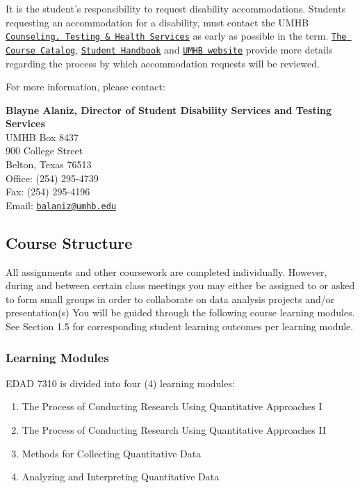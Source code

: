 \documentclass[
]{article}
\providecommand{\tightlist}{%
  \setlength{\itemsep}{0pt}\setlength{\parskip}{0pt}}
\begin{document}
It is the student's responsibility to request disability accommodations.
Students requesting an accommodation for a disability, must contact the
UMHB
\href{http://cths.umhb.edu/disability}{\texttt{Counseling, Testing \& Health Services}}
as early as possible in the term.
\href{http://catalog.umhb.edu/en/2019-2020/Graduate-Catalog}{\texttt{The Course Catalog}},
\href{http://students.umhb.edu/student-handbook}{\texttt{Student Handbook}}
and \href{https://go.umhb.edu/}{\texttt{UMHB website}} provide more
details regarding the process by which accommodation requests will be
reviewed.

For more information, please contact:

\textbf{Blayne Alaniz, Director of Student Disability Services and
Testing Services}\\
UMHB Box 8437\\
900 College Street\\
Belton, Texas 76513\\
Office: (254) 295-4739\\
Fax: (254) 295-4196\\
Email: \texttt{\href{mailto:balaniz@umhb.edu}{balaniz@umhb.edu}}

\subsection{Course Structure}

All assignments and other coursework are completed individually.
However, during and between certain class meetings you may either be
assigned to or asked to form small groups in order to collaborate on
data analysis projects and/or presentation(s) You will be guided through
the following course learning modules. See Section 1.5 for corresponding
student learning outcomes per learning module.

\subsubsection{Learning Modules}

EDAD 7310 is divided into four (4) learning modules:

\begin{enumerate}
\def\labelenumi{\arabic{enumi}.}
\tightlist
\item
  The Process of Conducting Research Using Quantitative Approaches I
\item
  The Process of Conducting Research Using Quantitative Approaches II
\item
  Methods for Collecting Quantitative Data
\item
  Analyzing and Interpreting Quantitative Data
\end{enumerate}
\end{document}
